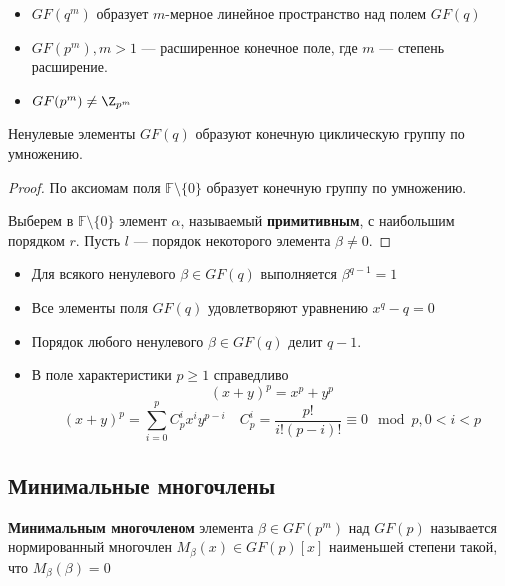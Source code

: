 \begin{itemize}
    \item \(GF(q^m)\) образует \(m\)-мерное линейное пространство над полем \(GF(q)\)
    \item \(GF(p^m), m > 1\) --- расширенное конечное поле, где \(m\) --- степень расширение.
    \item \(GF(p^m) \neq \Z_{p^m}\)
\end{itemize}

\begin{theorem}
    Ненулевые элементы \(GF(q)\) образуют конечную циклическую группу
    по умножению.
\end{theorem}
\begin{proof}
    По аксиомам поля \(\mathbb{F} \setminus \{0\}\) образует
    конечную группу по умножению.
    
    Выберем в \(\mathbb{F} \setminus \{0\}\) элемент \(\alpha\),
    называемый \textbf{примитивным}, с наибольшим порядком \(r\).
    Пусть \(l\) --- порядок некоторого элемента \(\beta \neq 0\).
    
    \unfinished
\end{proof}

\begin{prop}\itemfix
    \begin{itemize}
        \item Для всякого ненулевого \(\beta \in GF(q)\) выполняется \(\beta^{q - 1} = 1\)
        \item Все элементы поля \(GF(q)\) удовлетворяют уравнению \(x^q - q = 0\)
        \item Порядок любого ненулевого \(\beta \in GF(q)\) делит \(q - 1\).
        \item В поле характеристики \(p \geq 1\) справедливо
        \[(x + y)^p = x^p + y^p\]
        \[(x + y)^p = \sum_{i = 0}^p C_p^i x^i y^{p - i} \quad C_p^i = \frac{p!}{i!(p - i)!} \equiv 0 \mod p, 0 < i < p\]
    \end{itemize}
\end{prop}

\subsection{Минимальные многочлены}

\begin{definition}
    \textbf{Минимальным многочленом} элемента \(\beta \in GF(p^m)\) над \(GF(p)\)
    называется нормированный многочлен \(M_\beta(x) \in GF(p)[x]\)
    наименьшей степени такой, что \(M_\beta(\beta) = 0\)
\end{definition}

